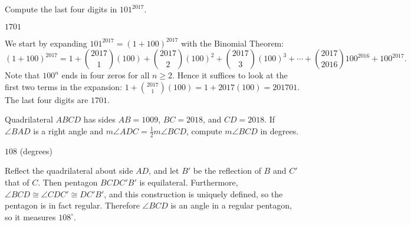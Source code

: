 \documentclass[11pt]{article}
\begin{document}
\begin{problem}%
Compute the last four digits in $101^{2017}$.
\end{problem}

\begin{answer}
$\boxed{1701}$
\end{answer}

\begin{solution}
We start by expanding $101^{2017} = (1 + 100)^{2017}$ with the Binomial Theorem:
\[(1 + 100)^{2017} = 1 + \binom{2017}{1}(100) + \binom{2017}{2}(100)^2 + 
\binom{2017}{3}(100)^3 + \cdots + \binom{2017}{2016}100^{2016} + 100^{2017}.\]
Note that $100^n$ ends in four zeros for all $n \ge 2$. Hence it suffices to look at the first two terms in the 
expansion: $1 + \binom{2017}{1}(100) = 1 + 2017(100) = 201701$. The last
four digits are $\boxed{1701}$.
\end{solution}


\begin{problem}
Quadrilateral $ABCD$ has sides $AB = 1009$, $BC = 2018$, and $CD = 2018$. If $\angle BAD$ is a right angle 
and $m\angle ADC = \frac{1}{2}m\angle BCD$, compute $m\angle BCD$ in degrees.
\end{problem}

\begin{answer}
$\boxed{108}$ (degrees)
\end{answer}

\begin{solution}
Reflect the quadrilateral about side $AD$, and let $B'$ be the reflection of $B$ and $C'$ that of $C$. 
Then pentagon $BCDC'B'$ is equilateral. Furthermore, $\angle BCD \cong \angle CDC' \cong DC'B'$, 
and this construction is uniquely defined, so the pentagon is in fact regular. 
Therefore $\angle BCD$ is an angle in a regular pentagon, so it measures $\boxed{108^\circ}$.
\end{solution}
\end{document}

